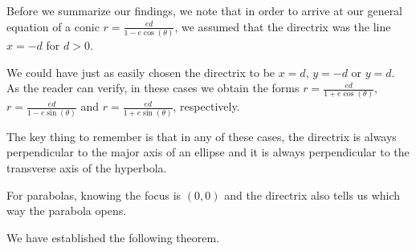 \documentclass{ximera}
\begin{document}
\smallskip

Before we summarize our findings, we note that in order to arrive at our general equation of a conic $r = \frac{ed}{1-e\cos(\theta)}$, we assumed that the directrix was the line $x = -d$ for $d > 0$. 

\smallskip

 We could have just as easily chosen the directrix to be $x = d$, $y = -d$ or $y = d$.  As the reader can verify, in these cases we obtain the forms  $r = \frac{ed}{1+e\cos(\theta)}$,  $r = \frac{ed}{1-e\sin(\theta)}$ and  $r = \frac{ed}{1+e\sin(\theta)}$, respectively. 
 
 \smallskip
 
 The key thing to remember is that in any of these cases, the directrix is always perpendicular to the major axis of an ellipse and it is always perpendicular to the transverse axis of the hyperbola.
 
 \smallskip
 
  For parabolas, knowing the focus is $(0,0)$ and the directrix also tells us which way the parabola opens.  
 
 \smallskip
 
 We have established the following theorem.

\smallskip
\end{document}
